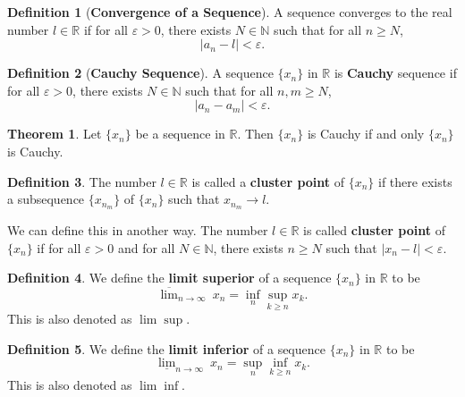 \documentclass[12pt]{article}
\newcommand{\R}{\mathbb{R}}
\newcommand{\N}{\mathbb{N}}
\renewcommand{\epsilon}{\varepsilon}
\theoremstyle{definition}
\newtheorem*{thm}{Theorem}
\newtheorem*{definition}{Definition}
\begin{document}
\begin{definition}[\textbf{Convergence of a Sequence}]

    A sequence converges to the real number \( l \in \R \) if for all \( \epsilon > 0 \), there exists \( N \in \N \) such that for all \( n \geq N \),
        \[
            |a_n - l| < \epsilon.  
        \]
    
\end{definition}

\begin{definition}[\textbf{Cauchy Sequence}]

    A sequence \( \{ x_n \} \) in \( \R \) is \textbf{Cauchy} sequence if for all \( \epsilon > 0 \), there exists \( N \in \N \) such that for all \( n, m \geq N \),
        \[
            | a_n - a_m| < \epsilon.  
        \]
    
\end{definition}

\begin{thm}
    Let \( \{x_n\} \) be a sequence in \( \R \). Then \( \{ x_n\} \) is Cauchy if and only \( \{ x_n \} \) is Cauchy.

\end{thm}

\begin{definition}
    The number \( l \in \R \) is called a \textbf{cluster point} of \(  \{x_n\} \) if there exists a subsequence \( \{ x_{n_{m}} \} \) of \( \{ x_n\} \) such that \( x_{n_{m}} \to l \).

    We can define this in another way. The number \( l \in \R \) is called \textbf{cluster point} of \( \{ x_n \} \) if for all \( \epsilon > 0 \) and for all \( N \in \N \), there exists \( n \geq N \) such that \( |x_n - l| < \epsilon \).
\end{definition}

\begin{definition}
    We define the \textbf{limit superior} of a sequence \( \{ x_n \} \) in \( \R \) to be 
        \[
            \overline{\lim}_{n \to \infty} \ x_n = \inf_{n} \sup_{k \geq n} x_k. 
        \]
    This is also denoted as \( \lim \sup \).
\end{definition}

\begin{definition}
    We define the \textbf{limit inferior} of a sequence \( \{ x_n \} \) in \( \R \) to be 
        \[
            \underline{\lim}_{n \to \infty} \ x_n = \sup_{n} \inf_{k \geq n} x_k. 
        \]
    This is also denoted as \( \lim \inf \).
\end{definition}
\end{document}
